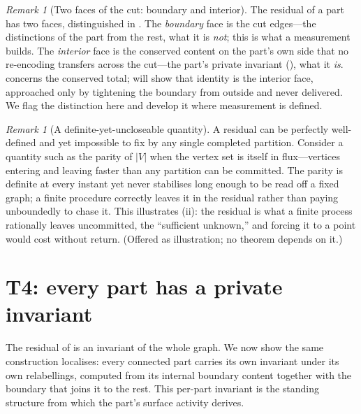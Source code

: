 \documentclass[11pt,a4paper]{article}
\theoremstyle{thmstyle}
\theoremstyle{definition}
\theoremstyle{remark}
\newtheorem{remark}[theorem]{Remark}
\newcommand{\V}{V}                        %
\newcommand{\abs}[1]{\lvert#1\rvert}
\begin{document}
\begin{remark}[Two faces of the cut: boundary and interior]
\label{rem:two-faces}
The residual of a part has two faces, distinguished in .
The \emph{boundary} face is the cut edges---the distinctions of the part from the
rest, what it is \emph{not}; this is what a measurement builds. The
\emph{interior} face is the conserved content on the part's own side that no
re-encoding transfers across the cut---the part's private invariant
(), what it \emph{is}.  concerns
the conserved total;  will show that identity is the
interior face, approached only by tightening the boundary from outside and never
delivered. We flag the distinction here and develop it where measurement is
defined.
\end{remark}

\begin{remark}[A definite-yet-uncloseable quantity]
\label{rem:cat-parity}
A residual can be perfectly well-defined and yet impossible to fix by any single
completed partition. Consider a quantity such as the parity of $\abs{\V}$ when
the vertex set is itself in flux---vertices entering and leaving faster than any
partition can be committed. The parity is definite at every instant yet never
stabilises long enough to be read off a fixed graph; a finite procedure
correctly leaves it in the residual rather than paying unboundedly to chase it.
This illustrates (ii): the residual is what a finite
process rationally leaves uncommitted, the ``sufficient unknown,'' and forcing it
to a point would cost without return. (Offered as illustration; no theorem
depends on it.)
\end{remark}


\section{T4: every part has a private invariant}
\label{sec:invariant}

The residual of  is an invariant of the whole graph. We now
show the same construction localises: every connected part carries its own
invariant under its own relabellings, computed from its internal boundary
content together with the boundary that joins it to the rest. This per-part
invariant is the standing structure from which the part's surface activity
derives.
\end{document}
